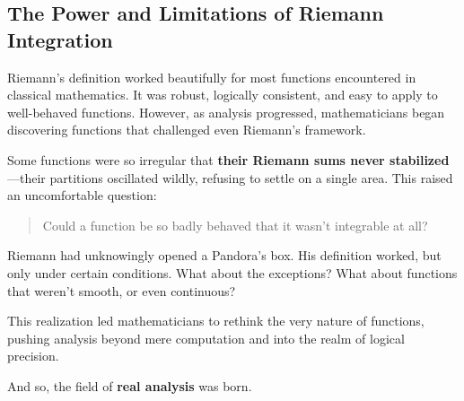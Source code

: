 \subsection{The Power and Limitations of Riemann Integration}

Riemann’s definition worked beautifully for most functions encountered in classical mathematics. It was robust, logically consistent, and easy to apply to well-behaved functions. However, as analysis progressed, mathematicians began discovering functions that challenged even Riemann’s framework.  

Some functions were so irregular that \textbf{their Riemann sums never stabilized}—their partitions oscillated wildly, refusing to settle on a single area. This raised an uncomfortable question:  

\begin{quote}
Could a function be so badly behaved that it wasn’t integrable at all?
\end{quote}

Riemann had unknowingly opened a Pandora’s box. His definition worked, but only under certain conditions. What about the exceptions? What about functions that weren’t smooth, or even continuous?  

This realization led mathematicians to rethink the very nature of functions, pushing analysis beyond mere computation and into the realm of logical precision.  

And so, the field of \textbf{real analysis} was born.  


